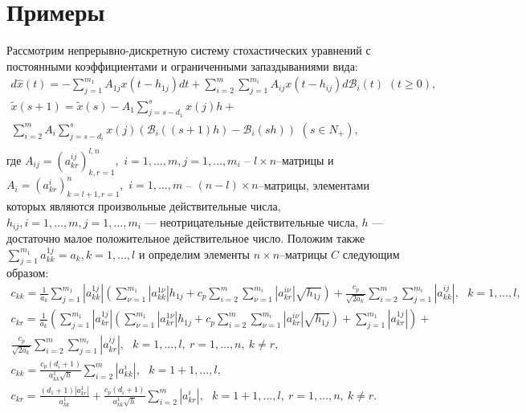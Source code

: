 \section{Примеры}
 Рассмотрим непрерывно-дискретную систему
стохастических уравнений с постоянными коэффициентами и
ограниченными запаздываниями вида:
\begin{equation}\label{kri-10}
\begin{array}{crl}
 d\hat x(t) = - \sum
 \limits_{j=1}^{m_1}A_{1j}x(t - h_{1j})dt +
 \sum \limits_{i=2}^m\sum \limits_{j=1}^{m_i}
 A_{ij}x(t - h_{ij})d\mathcal B_i(t) \, \, (t \ge 0),\\
\tilde x(s+1) = \tilde x(s) - A_{1}\sum \limits _{j=s -d_1 }^{s}
x(j)h + \\
\sum \limits _{i=2}^{m}A_{i}\sum \limits _{j=s-d_i}^{s}
x(j)(\mathcal B_i((s+1)h) - \mathcal B_i(sh))\, \,  (s
\in N_+),\\
\end{array}
\end{equation}
где  $A_{ij}=(a^{ij}_{kr})_{k,r=1}^{l,n}, \,\,i = 1,\dots,m, j =
1,\dots,m_i$ -- $l \times n$--матрицы и $A_i =
(a^i_{kr})_{k=l+1,r=1}^n, \,\,i = 1,\dots,m$ -- $(n-l)\times
n$--матрицы, элементами которых являются произвольные действительные
числа,  $h_{ij}, i = 1,\dots,m, j = 1,\dots,m_i$ --- неотрицательные
действительные числа, $h$ --- достаточно малое положительное
действительное число. Положим также $\sum \limits_{j=1}^{m_1}
a^{1j}_{kk} = a_k, k = 1,\dots,l$ и определим элементы $n\times
n$--матрицы $C$ следующим образом:
$$
\begin{array}{crl}
c_{kk}  = \frac{1}{a _k }\sum \limits_{j =1}^{m_1}
|a^{1j}_{kk}|\left(\sum \limits_{\nu=1}^{m_1} |a^{1\nu}_{kk}|h _{1j}
+ c_p\sum \limits_{i=2}^m \sum \limits_{\nu=1}^{m_i}
|a^{i\nu}_{kr}|\sqrt{h_{1j}}\right) + \frac{c_p}{\sqrt{2a_k }}\sum
\limits_{i=2}^m \sum \limits_{j=1}^{m_i}|a^{ij}_{kk}|, \ \ \ k = 1,\dots,l,\\
c_{kr} = \frac{1}{a _k }\left(\sum \limits_{j
=1}^{m_1}|a^{1j}_{kr}|\left(\sum
\limits_{\nu=1}^{m_1}|a^{1\nu}_{kr}| h_{1j} +  c_p\sum
\limits_{i=2}^m \sum \limits_{\nu=1}^{m_i}
|a^{i\nu}_{kr}|\sqrt{h_{1j}}\right) + \sum \limits_{j=1}^{m_1}
|a^{1j}_{kr}|\right)+ \\
\frac{c_p}{\sqrt{2a_k }}\sum \limits_{i=2}^m \sum
\limits_{j=1}^{m_i} |a^{ij}_{kr}|,  \ \ \ k =
1,\dots,l, \ r = 1, \dots, n, \ k \neq r,\\
 c_{kk} = \frac{c_p(d_i+1)}{a^1_{kk}\sqrt{h}}
\sum\limits _{i=2}^{m}|a^{i}_{kk}|, \ \ \ k = 1 + 1,\dots,l, \\
c_{kr} = \frac{(d_1 + 1)|a^{1}_{kr}|}{a^1_{kk}}
+\frac{c_p(d_i+1)}{a^1_{kk}\sqrt{h}} \sum\limits
_{i=2}^{m}|a^{i}_{kr}|, \ \ \ k = 1 + 1,\dots,l, \ r = 1, \dots, n, \ k
\neq r.
\end{array}
$$

